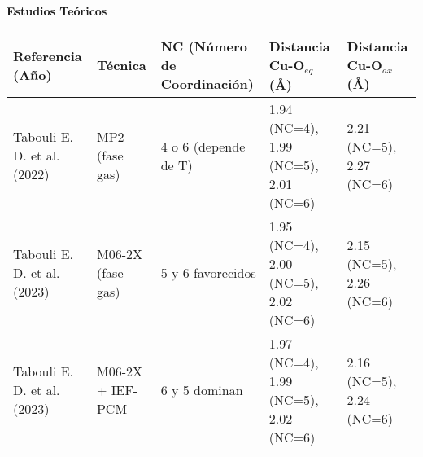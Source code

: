 \begin{sidewaystable}
{    \vspace{8mm} %

    \textbf{Estudios Teóricos}
    \vspace{2mm} %

    \begin{tabular}{@{}lllll@{}}
        \toprule
        \textbf{Referencia (Año)} & \textbf{Técnica} & \textbf{NC (Número de Coordinación)} & \textbf{Distancia Cu-O$_{eq}$ (\AA)} & \textbf{Distancia Cu-O$_{ax}$ (\AA)} \\
        \midrule
        Tabouli E. D. et al. (2022) & MP2 (fase gas)          & 4 o 6 (depende de T)  & 1.94 (NC=4), 1.99 (NC=5), 2.01 (NC=6)  & 2.21 (NC=5), 2.27 (NC=6)  \\
        Tabouli E. D. et al. (2023) & M06-2X (fase gas)       & 5 y 6 favorecidos     & 1.95 (NC=4), 2.00 (NC=5), 2.02 (NC=6)  & 2.15 (NC=5), 2.26 (NC=6)  \\
        Tabouli E. D. et al. (2023) & M06-2X + IEF-PCM        & 6 y 5 dominan         & 1.97 (NC=4), 1.99 (NC=5), 2.02 (NC=6)  & 2.16 (NC=5), 2.24 (NC=6)  \\
        \bottomrule
    \end{tabular}
    
    } %
\end{sidewaystable}

